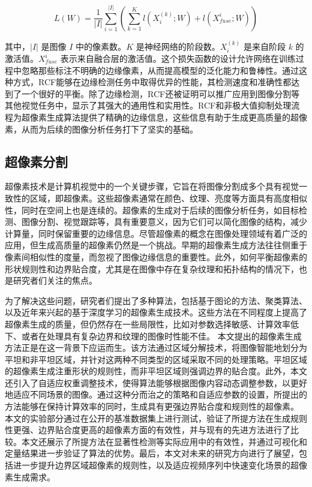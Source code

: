 \begin{equation}
  L(W) = \frac{1}{|I|} \sum_{i=1}^{|I|} \left( \sum_{k=1}^{K} l(X^{(k)}_i; W) + l(X_{fuse}^i; W) \right)
  \label{eq:rcf3}
\end{equation}

其中，\( |I| \) 是图像 \( I \) 中的像素数。\( K \) 是神经网络的阶段数。\( X^{(k)}_i \) 是来自阶段 \( k \) 的激活值。\( X_{fuse}^i \) 表示来自融合层的激活值。这个损失函数的设计允许网络在训练过程中忽略那些标注不明确的边缘像素，从而提高模型的泛化能力和鲁棒性。通过这种方式，RCF能够在边缘检测任务中取得优异的性能，其检测速度和准确性都达到了一个很好的平衡。除了边缘检测，RCF还被证明可以推广应用到图像分割等其他视觉任务中，显示了其强大的通用性和实用性。RCF和非极大值抑制处理流程为超像素生成算法提供了精确的边缘信息，这些信息有助于生成更高质量的超像素，从而为后续的图像分析任务打下了坚实的基础。

\subsection{超像素分割}

超像素技术是计算机视觉中的一个关键步骤，它旨在将图像分割成多个具有视觉一致性的区域，即超像素。这些超像素通常在颜色、纹理、亮度等方面具有高度相似性，同时在空间上也是连续的。超像素的生成对于后续的图像分析任务，如目标检测、图像分割、视觉跟踪等，具有重要意义，因为它们可以简化图像的结构，减少计算量，同时保留重要的边缘信息。尽管超像素的概念在图像处理领域有着广泛的应用，但生成高质量的超像素仍然是一个挑战。早期的超像素生成方法往往侧重于像素间相似性的度量，而忽视了图像边缘信息的重要性。此外，如何平衡超像素的形状规则性和边界贴合度，尤其是在图像中存在复杂纹理和拓扑结构的情况下，也是研究者们关注的焦点。

为了解决这些问题，研究者们提出了多种算法，包括基于图论的方法、聚类算法、以及近年来兴起的基于深度学习的超像素生成技术。这些方法在不同程度上提高了超像素生成的质量，但仍然存在一些局限性，比如对参数选择敏感、计算效率低下、或者在处理具有复杂边界和纹理的图像时性能不佳。
本文提出的超像素生成方法正是在这一背景下应运而生。该方法通过区域分解技术，将图像智能地划分为平坦和非平坦区域，并针对这两种不同类型的区域采取不同的处理策略。平坦区域的超像素生成注重形状的规则性，而非平坦区域则强调边界的贴合度。此外，本文还引入了自适应权重调整技术，使得算法能够根据图像内容动态调整参数，以更好地适应不同场景的图像。通过这种分而治之的策略和自适应参数的设置，所提出的方法能够在保持计算效率的同时，生成具有更强边界贴合度和规则性的超像素。
本文的实验部分通过在公开的基准数据集上进行测试，验证了所提方法在生成规则性更强、边界贴合度更高的超像素方面的有效性，并与现有的先进方法进行了比较。本文还展示了所提方法在显著性检测等实际应用中的有效性，并通过可视化和定量结果进一步验证了算法的优势。最后，本文对未来的研究方向进行了展望，包括进一步提升边界区域超像素的规则性，以及适应视频序列中快速变化场景的超像素生成需求。

